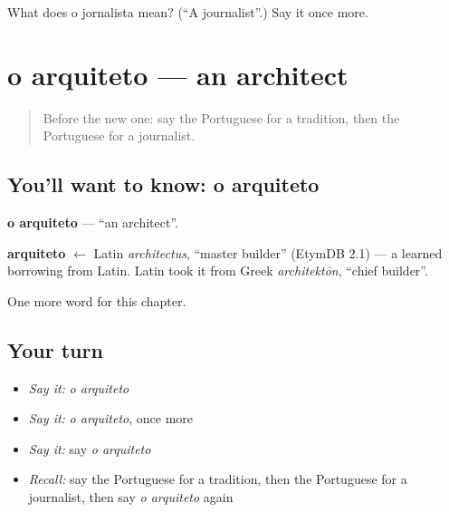\begin{tcolorbox}[breakable,colback=teal!4,colframe=teal!35!black,title={Before you move on}]
What does o jornalista mean? (\textquotedblleft{}A journalist\textquotedblright{}.) Say it once more.
\end{tcolorbox}
\section[o arquiteto]{o arquiteto — an architect}

\label{lesson:PT-C220-arquiteto}



\begin{quote}
Before the new one: say the Portuguese for a tradition, then the Portuguese for a journalist.
\end{quote}

\subsection*{You'll want to know: o arquiteto}
\textbf{o arquiteto} — \textquotedblleft{}an architect\textquotedblright{}.

\begin{cousinweb}
\textbf{arquiteto} $\leftarrow$ Latin \emph{architectus}, \textquotedblleft{}master builder\textquotedblright{} (EtymDB 2.1) — a learned borrowing from Latin. Latin took it from Greek \emph{architektōn}, \textquotedblleft{}chief builder\textquotedblright{}.
\end{cousinweb}

\begin{grammarlens}[title={What you've built}]
One more word for this chapter.
\end{grammarlens}

\subsection*{Your turn}
\begin{itemize}
\raggedright
  \item \emph{Say it:} \emph{o arquiteto}
  \item \emph{Say it:} \emph{o arquiteto}, once more
  \item \emph{Say it:} say \emph{o arquiteto}
  \item \emph{Recall:} say the Portuguese for a tradition, then the Portuguese for a journalist, then say \emph{o arquiteto} again
\end{itemize}

